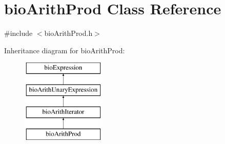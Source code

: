 \hypertarget{classbio_arith_prod}{}\section{bio\+Arith\+Prod Class Reference}
\label{classbio_arith_prod}


{\ttfamily \#include $<$bio\+Arith\+Prod.\+h$>$}

Inheritance diagram for bio\+Arith\+Prod\+:\begin{figure}[H]
\begin{center}
\leavevmode
\includegraphics[height=4.000000cm]{classbio_arith_prod}
\end{center}
\end{figure}
